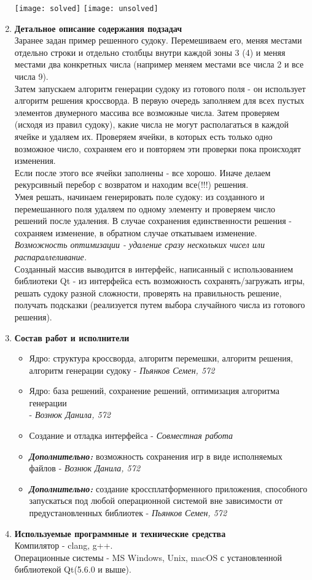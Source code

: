 \documentclass[12pt]{article}
\begin{document}
\begin{enumerate}
    \texttt{[image: solved]}
    \texttt{[image: unsolved]}

\item \textbf{Детальное описание содержания подзадач} \\
Заранее задан пример решенного судоку. Перемешиваем его, меняя местами отдельно строки и отдельно столбцы внутри каждой зоны 3 (4) и меняя местами два конкретных числа (например меняем местами все числа 2 и все числа 9).\\
Затем запускаем алгоритм генерации судоку из готового поля - он использует алгоритм решения кроссворда. В первую очередь заполняем для всех пустых элементов двумерного массива все возможные числа. Затем проверяем (исходя из правил судоку), какие числа не могут располагаться в каждой ячейке и удаляем их. Проверяем ячейки, в которых есть только одно возможное число, сохраняем его и повторяем эти проверки пока происходят изменения.\\
Если после этого все ячейки заполнены - все хорошо. Иначе делаем рекурсивный перебор с возвратом и находим все(!!!) решения.\\
Умея решать, начинаем генерировать поле судоку: из созданного и перемешанного поля удаляем по одному элементу и проверяем число решений после удаления. В случае сохранения единственности решения - сохраняем изменение, в обратном случае откатываем изменение. \textit{Возможность оптимизации - удаление сразу нескольких чисел или распараллеливание.}\\
Созданный массив выводится в интерфейс, написанный с использованием библиотеки Qt - из интерфейса есть возможность сохранять/загружать игры, решать судоку разной сложности, проверять на правильность решение, получать подсказки (реализуется путем выбора случайного числа из готового решения).\\

\item \textbf{Состав работ и исполнители} 
\begin{itemize}
    \item Ядро: структура кроссворда, алгоритм перемешки, алгоритм решения, алгоритм генерации судоку - \textit{Пьянков Семен, 572}
    \item Ядро: база решений, сохранение решений, оптимизация алгоритма генерации\\ - \textit{Вознюк Данила, 572}
    \item Создание и отладка интерфейса - \textit{Совместная работа}
    \item \textbf{\textit{Дополнительно:}} возможность сохранения игр в виде исполняемых файлов - \textit{Вознюк Данила, 572}
    \item \textbf{\textit{Дополнительно:}} создание кроссплатформенного приложения, способного запускаться под любой операционной системой вне зависимости от предустановленных библиотек - \textit{Пьянков Семен, 572}
\end{itemize}

\item \textbf{Используемые программные и технические средства} \\
Компилятор - clang, g++.\\
Операционные системы - MS Windows, Unix, macOS с установленной библиотекой Qt(5.6.0 и выше).

\end{enumerate}
\end{document}
